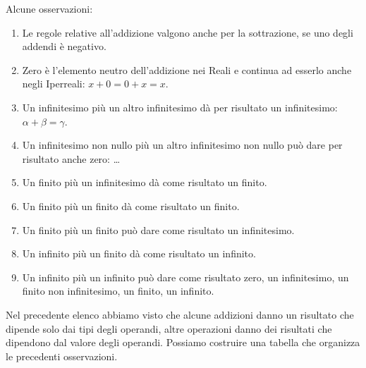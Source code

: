 Alcune osservazioni:
\begin{enumerate} [noitemsep]
 \item Le regole relative all'addizione valgono anche per la sottrazione, se 
uno degli addendi è negativo. 
 \item Zero è l'elemento neutro dell'addizione nei Reali e continua ad esserlo 
anche negli Iperreali: $x+0=0+x=x$.
 \item Un infinitesimo più un altro infinitesimo dà per risultato un 
infinitesimo: $\alpha+\beta=\gamma$.
 \item Un infinitesimo non nullo più un altro infinitesimo non nullo può dare 
per risultato anche zero: \dots
 \item Un finito più un infinitesimo dà come risultato un finito.
 \item Un finito più un finito dà come risultato un finito.
 \item Un finito più un finito può dare come risultato un infinitesimo.
 \item Un infinito più un finito dà come risultato un infinito.
 \item Un infinito più un infinito può dare come risultato zero, un 
infinitesimo, un finito non infinitesimo, un finito, un infinito.
\end{enumerate}

Nel precedente elenco abbiamo visto che alcune addizioni danno un risultato 
che dipende solo dai tipi degli operandi, altre operazioni danno dei risultati 
che dipendono dal valore degli operandi. Possiamo costruire una tabella che 
organizza le precedenti osservazioni.

\begin{center}
\renewcommand{\arraystretch}{.0}
\end{center}

